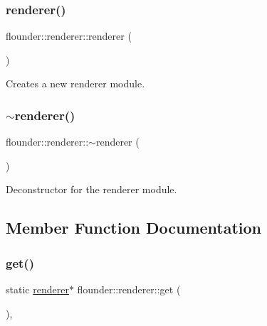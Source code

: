 \subsubsection{\texorpdfstring{renderer()}{renderer()}}
{\footnotesize\ttfamily flounder\+::renderer\+::renderer (\begin{DoxyParamCaption}{ }\end{DoxyParamCaption})}



Creates a new renderer module. 

\mbox{\label{classflounder_1_1renderer_ae8ad85deab4750f01112d7f5a84e95e5}} 
\subsubsection{\texorpdfstring{$\sim$renderer()}{~renderer()}}
{\footnotesize\ttfamily flounder\+::renderer\+::$\sim$renderer (\begin{DoxyParamCaption}{ }\end{DoxyParamCaption})}



Deconstructor for the renderer module. 



\subsection{Member Function Documentation}
\mbox{\label{classflounder_1_1renderer_a9dce14a77e80b7c631573cc153ac483a}} 
\subsubsection{\texorpdfstring{get()}{get()}}
{\footnotesize\ttfamily static \hyperlink{classflounder_1_1renderer}{renderer}$\ast$ flounder\+::renderer\+::get (\begin{DoxyParamCaption}{ }\end{DoxyParamCaption})\hspace{0.3cm}{\ttfamily [inline]}, {\ttfamily [static]}}



